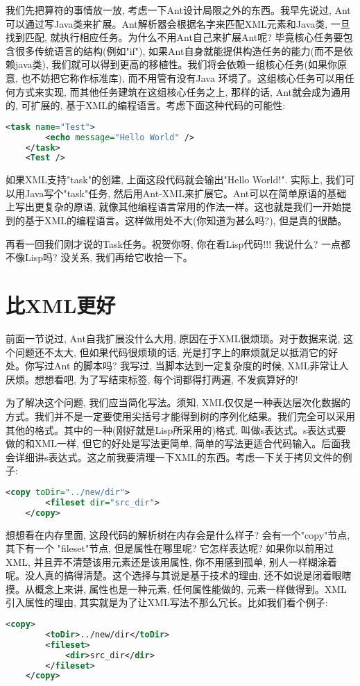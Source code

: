\documentclass[10pt]{article}
\begin{document}
我们先把算符的事情放一放, 考虑一下Ant设计局限之外的东西。我早先说过, Ant可以通过写Java类来扩展。Ant解析器会根据名字来匹配XML元素和Java类, 一旦找到匹配, 就执行相应任务。为什么不用Ant自己来扩展Ant呢? 毕竟核心任务要包含很多传统语言的结构(例如"if"), 如果Ant自身就能提供构造任务的能力(而不是依赖java类), 我们就可以得到更高的移植性。我们将会依赖一组核心任务(如果你原意, 也不妨把它称作标准库), 而不用管有没有Java 环境了。这组核心任务可以用任何方式来实现, 而其他任务建筑在这组核心任务之上, 那样的话, Ant就会成为通用的, 可扩展的, 基于XML的编程语言。考虑下面这种代码的可能性:
\begin{lstlisting}[language=xml]
  <task name="Test">
        <echo message="Hello World" />
    </task>
    <Test />
\end{lstlisting}

如果XML支持"task"的创建, 上面这段代码就会输出"Hello World!". 实际上, 我们可以用Java写个"task"任务, 然后用Ant-XML来扩展它。Ant可以在简单原语的基础上写出更复杂的原语, 就像其他编程语言常用的作法一样。这也就是我们一开始提到的基于XML的编程语言。这样做用处不大(你知道为甚么吗?), 但是真的很酷。

再看一回我们刚才说的Task任务。祝贺你呀, 你在看Lisp代码!!! 我说什么? 一点都不像Lisp吗? 没关系, 我们再给它收拾一下。
\section{比XML更好}
\label{sec-5}

前面一节说过, Ant自我扩展没什么大用, 原因在于XML很烦琐。对于数据来说, 这个问题还不太大, 但如果代码很烦琐的话, 光是打字上的麻烦就足以抵消它的好处。你写过Ant 的脚本吗? 我写过, 当脚本达到一定复杂度的时候, XML非常让人厌烦。想想看吧, 为了写结束标签, 每个词都得打两遍, 不发疯算好的!

为了解决这个问题, 我们应当简化写法。须知, XML仅仅是一种表达层次化数据的方式。我们并不是一定要使用尖括号才能得到树的序列化结果。我们完全可以采用其他的格式。其中的一种(刚好就是Lisp所采用的)格式, 叫做s表达式。s表达式要做的和XML一样, 但它的好处是写法更简单, 简单的写法更适合代码输入。后面我会详细讲s表达式。这之前我要清理一下XML的东西。考虑一下关于拷贝文件的例子:
\begin{lstlisting}[language=xml]
    <copy toDir="../new/dir">
        <fileset dir="src_dir">
    </copy>
\end{lstlisting}

想想看在内存里面, 这段代码的解析树在内存会是什么样子? 会有一个"copy"节点, 其下有一个 "fileset"节点, 但是属性在哪里呢? 它怎样表达呢? 如果你以前用过XML, 并且弄不清楚该用元素还是该用属性, 你不用感到孤单, 别人一样糊涂着呢。没人真的搞得清楚。这个选择与其说是基于技术的理由, 还不如说是闭着眼瞎摸。从概念上来讲, 属性也是一种元素, 任何属性能做的, 元素一样做得到。XML引入属性的理由, 其实就是为了让XML写法不那么冗长。比如我们看个例子:
\begin{lstlisting}[language=xml]
    <copy>
        <toDir>../new/dir</toDir>
        <fileset>
            <dir>src_dir</dir>
        </fileset>
    </copy>
\end{lstlisting}
\end{document}
